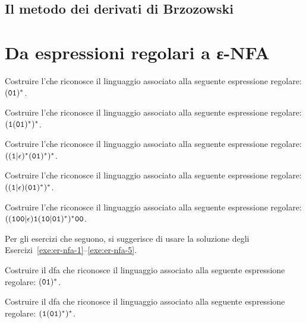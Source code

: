 \subsection{Il metodo dei derivati di Brzozowski}\label{sec:derivati-brzozowski}


\section{Da espressioni regolari a ε-NFA}
\label{sec:da-ER-a-eNFA}

\begin{Exercise}\label{exe:er-nfa-1}
	Costruire l'\enfa che riconosce il linguaggio associato alla seguente espressione regolare: $(\mathtt{0}\mathtt{1}){}^{\ast}$.
\end{Exercise}

\begin{Exercise}\label{exe:er-nfa-2}
	Costruire l'\enfa che riconosce il linguaggio associato alla seguente espressione regolare: $(\mathtt{1}(\mathtt{0}\mathtt{1}){}^{\ast}){}^{\ast}$.
\end{Exercise}

\begin{Exercise}\label{exe:er-nfa-3}
	Costruire l'\enfa che riconosce il linguaggio associato alla seguente espressione regolare: $((\mathtt{1}|\epsilon){}^{\ast}(\mathtt{0}\mathtt{1}){}^{\ast}){}^{\ast}$.
\end{Exercise}

\begin{Exercise}\label{exe:er-nfa-4}
	Costruire l'\enfa che riconosce il linguaggio associato alla seguente espressione regolare: $((\mathtt{1}|\epsilon)(\mathtt{0}\mathtt{1}){}^{\ast}){}^{\ast}$.
\end{Exercise}

\begin{Exercise}\label{exe:er-nfa-5}
	Costruire l'\enfa che riconosce il linguaggio associato alla seguente espressione regolare: $((\mathtt{1}\mathtt{0}\mathtt{0}|\epsilon)\mathtt{1}(\mathtt{1}\mathtt{0}|\mathtt{0}\mathtt{1}){}^{\ast}){}^{\ast}\mathtt{0}\mathtt{0}$.
\end{Exercise}

Per gli esercizi che seguono, si suggerisce di usare la soluzione degli Esercizi~\ref{exe:er-nfa-1}--\ref{exe:er-nfa-5}.


\begin{Exercise}\label{exe:er-dfa-1}
	Costruire il dfa che riconosce il linguaggio associato alla seguente espressione regolare: $(\mathtt{0}\mathtt{1}){}^{\ast}$.
\end{Exercise}

\begin{Exercise}\label{exe:er-dfa-2}
	Costruire il dfa che riconosce il linguaggio associato alla seguente espressione regolare: $(\mathtt{1}(\mathtt{0}\mathtt{1}){}^{\ast}){}^{\ast}$.
\end{Exercise}

